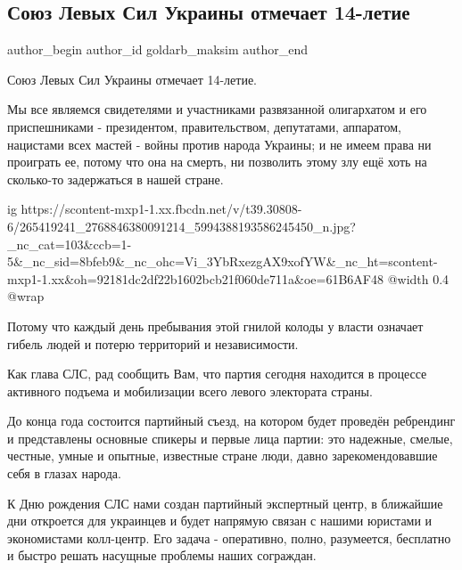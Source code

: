  
 
 
 
 
 
\subsection{Союз Левых Сил Украины отмечает 14-летие}
\label{sec:09_12_2021.fb.goldarb_maksim.1.sojuz_levyh_sil}
 
\ifcmt
 author_begin
   author_id goldarb_maksim
 author_end
\fi

Союз Левых Сил Украины отмечает 14-летие. 

Мы все являемся свидетелями и участниками развязанной олигархатом и его
приспешниками - президентом, правительством, депутатами, аппаратом, нацистами
всех мастей - войны против народа Украины; и не имеем права ни проиграть ее,
потому что она на смерть, ни позволить этому злу ещё хоть на сколько-то
задержаться в нашей стране. 

\ifcmt
  ig https://scontent-mxp1-1.xx.fbcdn.net/v/t39.30808-6/265419241_2768846380091214_5994388193586245450_n.jpg?_nc_cat=103&ccb=1-5&_nc_sid=8bfeb9&_nc_ohc=Vi_3YbRxezgAX9xofYW&_nc_ht=scontent-mxp1-1.xx&oh=92181dc2df22b1602bcb21f060de711a&oe=61B6AF48
  @width 0.4
  @wrap 
\fi

Потому что каждый день пребывания этой гнилой колоды у власти означает гибель
людей и потерю территорий и независимости. 

Как глава СЛС, рад сообщить Вам, что партия сегодня находится в процессе
активного подъема и мобилизации всего левого электората страны. 

До конца года состоится партийный съезд, на котором будет проведён ребрендинг и
представлены основные спикеры и первые лица партии: это надежные, смелые,
честные, умные и опытные, известные стране люди, давно зарекомендовавшие себя в
глазах народа. 

К Дню рождения СЛС нами создан партийный экспертный центр, в ближайшие дни
откроется для украинцев и будет напрямую связан с нашими юристами и
экономистами колл-центр. Его задача - оперативно, полно, разумеется, бесплатно
и быстро решать насущные проблемы наших сограждан. 

